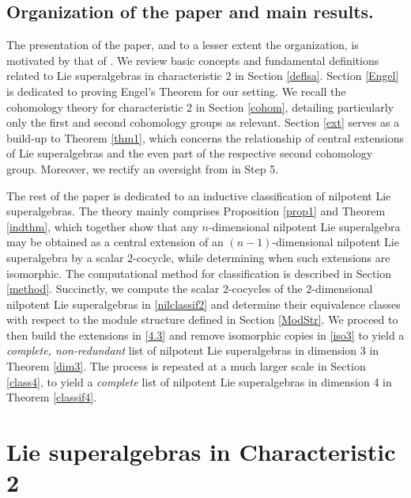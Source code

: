 \documentclass[12pt]{amsart}
\begin{document}
\vspace{1 em}

\subsection{Organization of the paper and main results.} The presentation of the paper, and to a lesser extent the organization, is motivated by that of \cite{BE}. We review basic concepts and fundamental definitions related to Lie superalgebras in characteristic 2 in Section \ref{deflsa}. Section \ref{Engel} is dedicated to proving Engel's Theorem for our setting. We recall the cohomology theory for characteristic 2 in Section \ref{cohom}, detailing particularly only the first and second cohomology groups as relevant. Section \ref{ext} serves as a build-up to Theorem \ref{thm1}, which concerns the relationship of central extensions of Lie superalgebras and the even part of the respective second cohomology group. Moreover, we rectify an oversight from \cite[Theorem 3.5.3]{BE} in Step 5.

The rest of the paper is dedicated to an inductive classification of nilpotent Lie superalgebras. The theory mainly comprises Proposition \ref{prop1} and Theorem \ref{indthm}, which together show that any $n$-dimensional nilpotent Lie superalgebra may be obtained as a central extension of an $(n-1)$-dimensional nilpotent Lie superalgebra by a scalar $2$-cocycle, while determining when such extensions are isomorphic. The computational method for classification is described in Section \ref{method}. Succinctly, we compute the scalar $2$-cocycles of the $2$-dimensional nilpotent Lie superalgebras in \ref{nilclassif2} and determine their equivalence classes with respect to the module structure defined in Section \ref{ModStr}. We proceed to then build the extensions in \ref{4.3} and remove isomorphic copies in \ref{iso3} to yield a \emph{complete, non-redundant} list of nilpotent Lie superalgebras in dimension 3 in Theorem \ref{dim3}. The process is repeated at a much larger scale in Section \ref{class4}, to yield a \emph{complete} list of nilpotent Lie superalgebras in dimension 4 in Theorem \ref{classif4}.

\section{Lie superalgebras in Characteristic 2}

\vspace{0.5 em}
\end{document}
